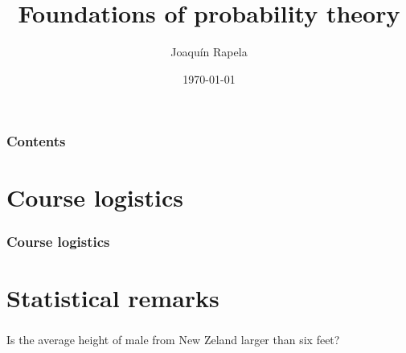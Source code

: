 \documentclass{beamer}
\title{Foundations of probability theory}
\author{Joaqu\'{i}n Rapela} %
\institute[GCNU, UCL] %
{
Gatsby Computational Neuroscience Unit\\University College London %
}
\date{\today} %
\begin{document}
\begin{frame}
\titlepage %
\end{frame}

\begin{frame}
\frametitle{Contents} %
\tableofcontents %
\end{frame}

\section{Course logistics}

\begin{frame}
\frametitle{Course logistics}
\end{frame}

\section{Statistical remarks}

\begin{frame}
    \frametitle{}

    \begin{example}

        Is the average height of male from New Zeland larger than six feet?

    \end{example}

\end{frame}
\end{document}
